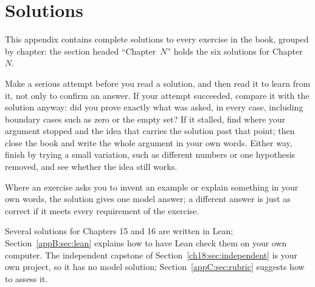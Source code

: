 \chapter{Solutions}\label{app:solutions}
This appendix contains complete solutions to every exercise in the book, grouped by chapter: the section headed ``Chapter~$N$'' holds the six solutions for Chapter~$N$.

Make a serious attempt before you read a solution, and then read it to learn from it, not only to confirm an answer. If your attempt succeeded, compare it with the solution anyway: did you prove exactly what was asked, in every case, including boundary cases such as zero or the empty set? If it stalled, find where your argument stopped and the idea that carries the solution past that point; then close the book and write the whole argument in your own words. Either way, finish by trying a small variation, such as different numbers or one hypothesis removed, and see whether the idea still works.

Where an exercise asks you to invent an example or explain something in your own words, the solution gives one model answer; a different answer is just as correct if it meets every requirement of the exercise.

Several solutions for Chapters 15 and 16 are written in Lean; Section~\ref{appB:sec:lean} explains how to have Lean check them on your own computer. The independent capstone of Section~\ref{ch18:sec:independent} is your own project, so it has no model solution; Section~\ref{appC:sec:rubric} suggests how to assess it.



















